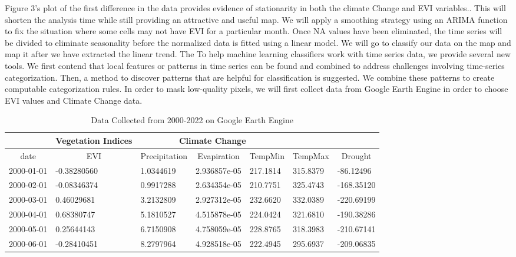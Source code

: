  Figure 3's plot of the first difference in the data provides evidence of stationarity in both the climate Change and EVI variables.. This will shorten the analysis time while still providing an attractive and useful map. We will apply a smoothing strategy using an ARIMA function to fix the situation where some cells may not have  EVI for a particular month. Once NA values have been eliminated, the time series will be divided to eliminate seasonality before the normalized data is fitted using a linear model. We will go to classify our data on the map and map it after we have extracted the linear trend.
The 
To help machine learning classifiers work with time series data, we provide several new tools. We first contend that local features or patterns in time series can be found and combined to address challenges involving time-series categorization. Then, a method to discover patterns that are helpful for classification is suggested. We combine these patterns to create computable categorization rules. In order to mask low-quality pixels, we will first collect data from Google Earth Engine in order to choose  EVI values and Climate Change data.
\begin{table}[]
	\label{DataFrame}
	\caption{Data Collected from 2000-2022 on Google Earth Engine }
	\centering
	\begin{tabularx}{\textwidth}{@{}cllllll@{}}
		\toprule
		& \multicolumn{1}{c}{Vegetation Indices}   & \multicolumn{3}{c}{Climate Change}  \\ \midrule
		\multicolumn{1}{c}{date} & \multicolumn{1}{c}{EVI} & \multicolumn{1}{c}{Precipitation} & \multicolumn{1}{c}{Evapiration} & \multicolumn{1}{c}{TempMin} & \multicolumn{1}{c}{TempMax} &\multicolumn{1}{c}{Drought}\\ \midrule
		
		
		2000-01-01&	-0.38280560&	1.0344619&	2.936857e-05&	217.1814&	315.8379&	-86.12496\\
		2000-02-01&	-0.08346374&	0.9917288&	2.634354e-05&	210.7751&	325.4743&	-168.35120\\
		2000-03-01&	0.46029681&	3.2132809&	2.927312e-05&	232.6620&	332.0389&	-220.69199\\
		2000-04-01&	0.68380747&	5.1810527&	4.515878e-05&	224.0424&	321.6810&	-190.38286\\
		2000-05-01&	0.25644143&	6.7150908&	4.758059e-05&	228.8765&	318.3983&	-210.67141\\
		2000-06-01&	-0.28410451&	8.2797964&	4.928518e-05&	222.4945&	295.6937&	-209.06835\\\bottomrule
		
	\end{tabularx}
\end{table}
